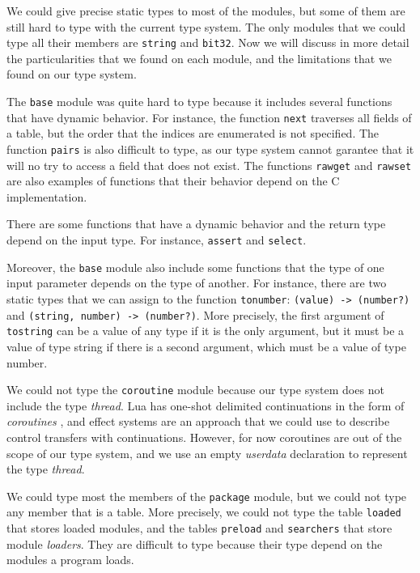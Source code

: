 We could give precise static types to most of the modules,
but some of them are still hard to type with the current type
system.
The only modules that we could type all their members are
\texttt{string} and \texttt{bit32}.
Now we will discuss in more detail the particularities that
we found on each module, and the limitations that we found
on our type system.

The \texttt{base} module was quite hard to type because it
includes several functions that have dynamic behavior.
For instance, the function \texttt{next} traverses all
fields of a table, but the order that the indices are
enumerated is not specified.
The function \texttt{pairs} is also difficult to type, as
our type system cannot garantee that it will no try to
access a field that does not exist.
The functions \texttt{rawget} and \texttt{rawset} are also
examples of functions that their behavior depend on the
C implementation.

There are some functions that have a dynamic behavior and
the return type depend on the input type.
For instance, \texttt{assert} and \texttt{select}.

Moreover, the \texttt{base} module also include some functions
that the type of one input parameter depends on the type of
another.
For instance, there are two static types that we can
assign to the function \texttt{tonumber}:
\texttt{(value) -> (number?)} and
\texttt{(string, number) -> (number?)}.
More precisely, the first argument of \texttt{tostring} can be
a value of any type if it is the only argument, but it must
be a value of type string if there is a second argument,
which must be a value of type number.

We could not type the \texttt{coroutine} module because our
type system does not include the type \emph{thread}.
Lua has one-shot delimited continuations \citep{james2011yield}
in the form of \emph{coroutines} \citep{moura2009rc}, and
effect systems \citep{nielson1999type} are an approach that we
could use to describe control transfers with continuations.
However, for now coroutines are out of the scope of our type
system, and we use an empty \emph{userdata} declaration
to represent the type \emph{thread}.

We could type most the members of the \texttt{package} module,
but we could not type any member that is a table.
More precisely, we could not type the table \texttt{loaded}
that stores loaded modules, and the tables \texttt{preload}
and \texttt{searchers} that store module \emph{loaders}.
They are difficult to type because their type depend on the
modules a program loads.

